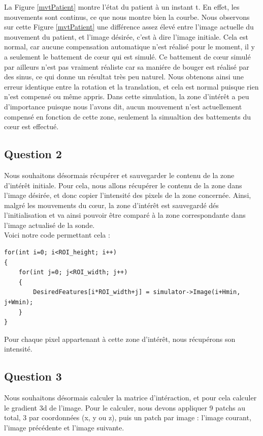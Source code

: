 \documentclass[a4paper,11pt]{article}
\begin{document}
La Figure \ref{mvtPatient} montre l'\'etat du patient \`a un instant t. En effet, les mouvements sont continus, ce que nous montre bien la courbe. Nous observons sur cette Figure \ref{mvtPatient} une diff\'erence assez \'elev\'e entre l'image actuelle du mouvement du patient, et l'image d\'esir\'ee, c'est \`a dire l'image initiale. Cela est normal, car aucune compensation automatique n'est r\'ealis\'e pour le moment, il y a seulement le battement de c\oe ur qui est simul\'e. Ce battement de c\oe ur simul\'e par ailleurs n'est pas vraiment r\'ealiste car sa mani\'ere de bouger est r\'ealis\'e par des sinus, ce qui donne un r\'esultat tr\`es peu naturel. Nous obtenons ainsi une erreur identique entre la rotation et la translation, et cela est normal puisque rien n'est compens\'e ou m\^eme appris.
Dans cette simulation, la zone d'int\'er\^et a peu d'importance puisque nous l'avons dit, aucun mouvement n'est actuellement compens\'e en fonction de cette zone, seulement la simualtion des battements du c\oe ur est effectu\'e.


\subsection{Question 2}
Nous souhaitons d\'esormais r\'ecup\'erer et sauvegarder le contenu de la zone d'int\'er\^et initiale. Pour cela, nous allons r\'ecup\'erer le contenu de la zone dans l'image d\'esir\'ee, et donc copier l'intensit\'e des pixels de la zone concern\'ee. Ainsi, malgr\'e les mouvements du c\oe ur, la zone d'int\'er\^et est sauvegard\'e d\'es l'initialisation et va ainsi pouvoir \^etre compar\'e \`a la zone correspondante dans l'image actualis\'e de la sonde.\\

Voici notre code permettant cela :
\begin{verbatim}
for(int i=0; i<ROI_height; i++) 
{
    for(int j=0; j<ROI_width; j++) 
    {
        DesiredFeatures[i*ROI_width+j] = simulator->Image(i+Hmin, j+Wmin);
    }
}
\end{verbatim}
Pour chaque pixel appartenant \`a cette zone d'int\'er\^et, nous r\'ecup\'erons son intensit\'e.

\subsection{Question 3}
Nous souhaitons d\'esormais calculer la matrice d'int\'eraction, et pour cela calculer le gradient 3d de l'image. Pour le calculer, nous devons appliquer 9 patchs au total, 3 par coordonn\'ees (x, y ou z), puis un patch par image : l'image courant, l'image pr\'ec\'edente et l'image suivante. \\
\end{document}
